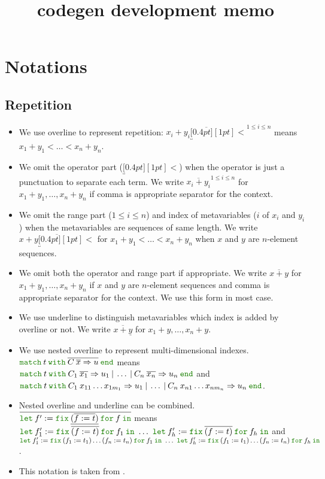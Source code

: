\documentclass[a4paper,fleqn]{article}
\title{codegen development memo}
\newcommand{\kwlet}{\mbox{\color{mygreen}\ttfamily let}}
\newcommand{\kwin}{\mbox{\color{mygreen}\ttfamily in}}
\newcommand{\kwmatch}{\mbox{\color{mygreen}\ttfamily match}}
\newcommand{\kwwith}{\mbox{\color{mygreen}\ttfamily with}}
\newcommand{\kwend}{\mbox{\color{mygreen}\ttfamily end}}
\newcommand{\kwfix}{\mbox{\color{mygreen}\ttfamily fix}}
\newcommand{\kwfor}{\mbox{\color{mygreen}\ttfamily for}}
\newcommand{\letinB}[2]{\kwlet\:#1:=#2\:\kwin}
\newcommand{\omatch}[2]{\kwmatch\:#1\:\kwwith\:{#2}\:\kwend}
\newcommand{\ofix}[2]{\kwfix\:{#1}\:\kwfor\:{#2}}
\newcommand{\rep}[1]{\overline{#1}}
\newcommand{\repop}[2]{\overline{#1\underbracket[0.4pt][1pt]{#2}}}
\newcommand{\repi}[2]{\overline{#1}^{#2}}
\begin{document}
\maketitle

\section{Notations}\label{sec:notations}

\subsection{Repetition}

\begin{itemize}
  \item We use overline to represent repetition:
    $\repop{x_i+y_i}{<}^{1\leq i \leq n}$ means $x_1+y_1 < \ldots < x_n+y_n$.
  \item We omit the operator part ($\underbracket[0.4pt][1pt]{<}$) when the operator is just a punctuation to separate each term.
    We write $\repi{x_i+y_i}{1\leq i \leq n}$ for $x_1+y_1, \ldots, x_n+y_n$ if comma is appropriate separator for the context.
  \item We omit the range part ($1\leq i \leq n$) and index of metavariables ($i$ of $x_i$ and $y_i$) when the metavariables are sequences of same length.
    We write $\repop{x+y}{<}$ for $x_1+y_1 < \ldots < x_n+y_n$ when $x$ and $y$ are $n$-element sequences.
  \item We omit both the operator and range part if appropriate.
    We write $\rep{x+y}$ for $x_1+y_1, \ldots, x_n+y_n$ if $x$ and $y$ are $n$-element sequences and comma is appropriate separator for the context.
    We use this form in most case.
  \item We use underline to distinguish metavariables which index is added by overline or not.
    We write $\rep{x+\underline{y}}$ for $x_1+y, \ldots, x_n+y$.
  \item We use nested overline to represent multi-dimensional indexes. \\
    $\omatch{t}{\rep{C\:\rep{x}\Rightarrow u}}$ means \\
    $\omatch{t}{C_1\:\rep{x_1}\Rightarrow u_1 \:|\: \ldots \:|\: C_n\:\rep{x_n}\Rightarrow u_n}$ and \\
    $\omatch{t}{C_1\: x_{11}\ldots x_{1m_1} \Rightarrow u_1
                \:|\: \ldots
                \:|\: C_n\: x_{n1}\ldots x_{nm_n} \Rightarrow u_n}$.
  \item Nested overline and underline can be combined. \\
    $\rep{\letinB{f'}{\ofix{\underline{(\rep{f:=t})}}{f}}}$ means \\
    $\letinB{f'_1}{\ofix{\rep{(f:=t)}}{f_1}} ~\ldots~
     \letinB{f'_h}{\ofix{\rep{(f:=t)}}{f_h}}$ and \\
    $\letinB{f'_1}{\ofix{(f_1:=t_1)\ldots(f_n:=t_n)}{f_1}} ~\ldots~
     \letinB{f'_h}{\ofix{(f_1:=t_1)\ldots(f_n:=t_n)}{f_h}}$.
  \item This notation is taken from \cite{steele2017s}.
\end{itemize}
\end{document}
